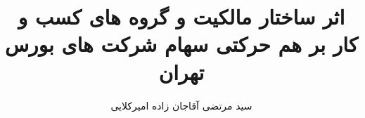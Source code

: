 \title{
	اثر ساختار مالکیت و گروه های کسب و کار بر هم حرکتی سهام شرکت های بورس تهران
}
\author{
سید مرتضی آقاجان زاده امیرکلایی}
